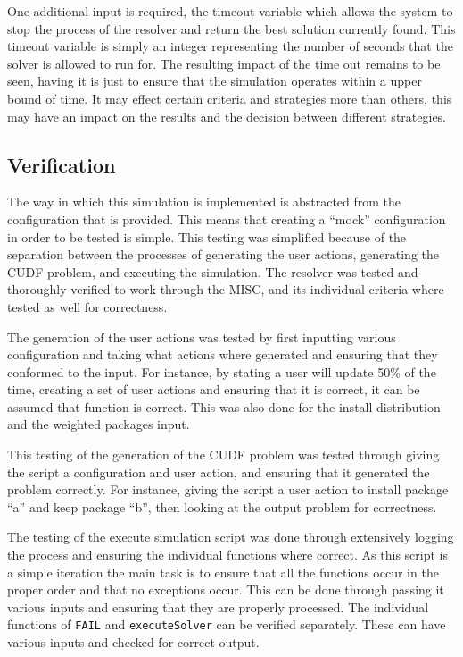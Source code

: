 One additional input is required, the timeout variable which allows the system to stop the process of the resolver and return the best solution currently found.
This timeout variable is simply an integer representing the number of seconds that the solver is allowed to run for.
The resulting impact of the time out remains to be seen, having it is just to ensure that the simulation operates within a upper bound of time.
It may effect certain criteria and strategies more than others, this may have an impact on the results and the decision between different strategies.

\subsection{Verification}
The way in which this simulation is implemented is abstracted from the configuration that is provided.
This means that creating a ``mock'' configuration in order to be tested is simple.
This testing was simplified because of the separation between the processes of generating the user actions, generating the CUDF problem, and executing the simulation.
The resolver was tested and thoroughly verified to work through the MISC, and its individual criteria where tested as well for correctness.

The generation of the user actions was tested by first inputting various configuration and taking what actions where generated and ensuring that they conformed to the input.
For instance, by stating a user will update 50\% of the time, creating a set of user actions and ensuring that it is correct, it can be assumed that function is correct.
This was also done for the install distribution and the weighted packages input.

This testing of the generation of the CUDF problem was tested through giving the script a configuration and user action, and ensuring that it generated the problem correctly. 
For instance, giving the script a user action to install package ``a'' and keep package ``b'', then looking at the output problem for correctness.

The testing of the execute simulation script was done through extensively logging the process and ensuring the individual functions where correct.
As this script is a simple iteration the main task is to ensure that all the functions occur in the proper order and that no exceptions occur.
This can be done through passing it various inputs and ensuring that they are properly processed.
The individual functions of \verb+FAIL+ and \verb+executeSolver+ can be verified separately.
These can have various inputs and checked for correct output.

